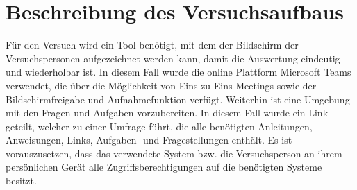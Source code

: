 \section{Beschreibung des Versuchsaufbaus}
\label{ch:Ergebnisse:sec:Versuchsaufbau}

Für den Versuch wird ein Tool benötigt, mit dem der Bildschirm der Versuchspersonen aufgezeichnet werden kann, damit die Auswertung eindeutig und wiederholbar ist. In diesem Fall wurde die online Plattform Microsoft Teams verwendet, die über die Möglichkeit von Eins-zu-Eins-Meetings sowie der Bildschirmfreigabe und Aufnahmefunktion verfügt.
Weiterhin ist eine Umgebung mit den Fragen und Aufgaben vorzubereiten. In diesem Fall wurde ein Link geteilt, welcher zu einer Umfrage führt, die alle benötigten Anleitungen, Anweisungen, Links, Aufgaben- und Fragestellungen enthält.
Es ist vorauszusetzen, dass das verwendete System bzw. die Versuchsperson an ihrem persönlichen Gerät alle Zugriffsberechtigungen auf die benötigten Systeme besitzt.
